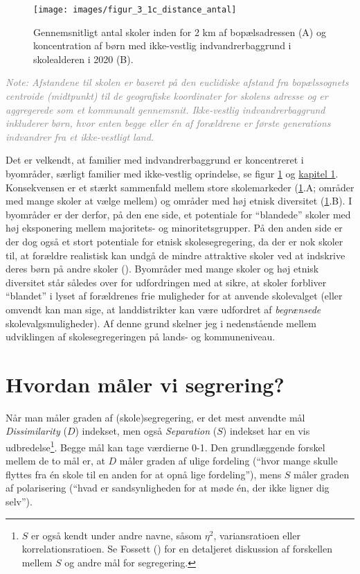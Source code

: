 \documentclass[
]{book}
\begin{document}
\begin{figure}
\texttt{[image: images/figur\_3\_1c\_distance\_antal]} \caption{Gennemsnitligt antal skoler inden for 2 km af bopælsadressen (A) og koncentration af børn med ikke-vestlig indvandrerbaggrund i skolealderen i 2020 (B).}\label{fig:fig-4-1}
\end{figure}

\begin{footnotesize}\textit{\textcolor{gray}{
Note: Afstandene til skolen er baseret på den euclidiske afstand fra bopælssognets centroide (midtpunkt) til de geografiske koordinater for skolens adresse og er aggregerede som et kommunalt gennemsnit. Ikke-vestlig indvandrerbaggrund inkluderer børn, hvor enten begge eller én af forældrene er første generations indvandrer fra et ikke-vestligt land.
}}
\end{footnotesize}

Det er velkendt, at familier med indvandrerbaggrund er koncentreret i byområder, særligt familier med ikke-vestlig oprindelse, se figur \ref{fig:fig-4-1} og \hyperref[kap1]{kapitel 1}. Konsekvensen er et stærkt sammenfald mellem store skolemarkeder (\ref{fig:fig-4-1}.A; områder med mange skoler at vælge mellem) og områder med høj etnisk diversitet (\ref{fig:fig-4-1}.B). I byområder er der derfor, på den ene side, et potentiale for ``blandede'' skoler med høj eksponering mellem majoritets- og minoritetsgrupper. På den anden side er der dog også et stort potentiale for etnisk skolesegregering, da der er nok skoler til, at forældre realistisk kan undgå de mindre attraktive skoler ved at indskrive deres børn på andre skoler (). Byområder med mange skoler og høj etnisk diversitet står således over for udfordringen med at sikre, at skoler forbliver ``blandet'' i lyset af forældrenes frie muligheder for at anvende skolevalget (eller omvendt kan man sige, at landdistrikter kan være udfordret af \emph{begrænsede} skolevalgsmuligheder). Af denne grund skelner jeg i nedenstående mellem udviklingen af skolesegregeringen på lands- og kommuneniveau.

\section{Hvordan måler vi segrering?}\label{hvordan-muxe5ler-vi-segrering}

Når man måler graden af (skole)segregering, er det mest anvendte mål \emph{Dissimilarity} (\(D\)) indekset, men også \emph{Separation} (\(S\)) indekset har en vis udbredelse\footnote{\(S\) er også kendt under andre navne, såsom \(\eta^2\), variansratioen eller korrelationsratioen. Se Fossett () for en detaljeret diskussion af forskellen mellem \(S\) og andre mål for segregering.}. Begge mål kan tage værdierne 0-1. Den grundlæggende forskel mellem de to mål er, at \(D\) måler graden af ulige fordeling (``hvor mange skulle flyttes fra én skole til en anden for at opnå lige fordeling''), mens \(S\) måler graden af polarisering (``hvad er sandsynligheden for at møde én, der ikke ligner dig selv'').
\end{document}
